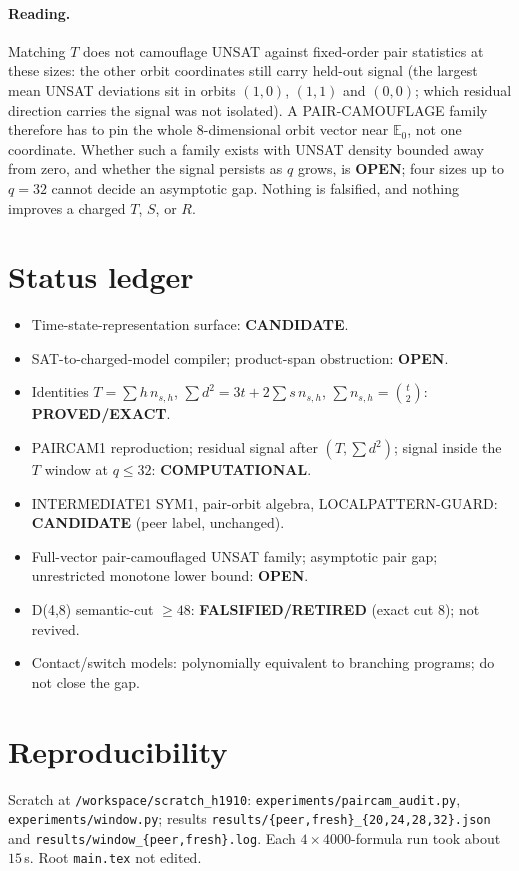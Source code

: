 \documentclass[11pt]{article}
\begin{document}
\paragraph{Reading.} Matching $T$ does not camouflage UNSAT against fixed-order pair statistics at these sizes: the other orbit coordinates still carry held-out signal (the largest mean UNSAT deviations sit in orbits $(1,0)$, $(1,1)$ and $(0,0)$; which residual direction carries the signal was not isolated). A PAIR-CAMOUFLAGE family therefore has to pin the whole $8$-dimensional orbit vector near $\mathbb E_0$, not one coordinate. Whether such a family exists with UNSAT density bounded away from zero, and whether the signal persists as $q$ grows, is \textbf{OPEN}; four sizes up to $q=32$ cannot decide an asymptotic gap. Nothing is falsified, and nothing improves a charged $T$, $S$, or $R$.

\section*{Status ledger}
\begin{itemize}
\item Time-state-representation surface: \textbf{CANDIDATE}.
\item SAT-to-charged-model compiler; product-span obstruction: \textbf{OPEN}.
\item Identities $T=\sum h\,n_{s,h}$, $\sum d^2=3t+2\sum s\,n_{s,h}$, $\sum n_{s,h}=\binom t2$: \textbf{PROVED/EXACT}.
\item PAIRCAM1 reproduction; residual signal after $(T,\sum d^2)$; signal inside the $T$ window at $q\le32$: \textbf{COMPUTATIONAL}.
\item INTERMEDIATE1 SYM1, pair-orbit algebra, LOCALPATTERN-GUARD: \textbf{CANDIDATE} (peer label, unchanged).
\item Full-vector pair-camouflaged UNSAT family; asymptotic pair gap; unrestricted monotone lower bound: \textbf{OPEN}.
\item D(4,8) semantic-cut $\ge48$: \textbf{FALSIFIED/RETIRED} (exact cut 8); not revived.
\item Contact/switch models: polynomially equivalent to branching programs; do not close the gap.
\end{itemize}

\section*{Reproducibility}
Scratch at \texttt{/workspace/scratch\_h1910}: \texttt{experiments/paircam\_audit.py}, \texttt{experiments/window.py}; results \texttt{results/\{peer,fresh\}\_\{20,24,28,32\}.json} and \texttt{results/window\_\{peer,fresh\}.log}. Each $4\times4000$-formula run took about $15$\,s. Root \texttt{main.tex} not edited.
\end{document}
